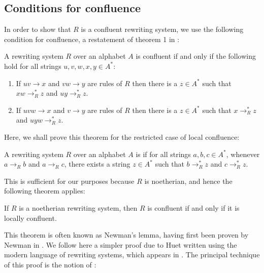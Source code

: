 \documentclass[nosubthm]{lmaths}
\begin{document}
\subsection{Conditions for confluence}

In order to show that $R$ is a confluent rewriting system, we use the following condition for confluence, a restatement of theorem 1 in \cite{McNaughton1987}:
\begin{theorem}
	A rewriting system $R$ over an alphabet $A$ is confluent if and only if the following hold for all strings $u, v, w, x, y \in A^*$:
	\begin{enumerate}[(1)]
		\item \label{it:conf-overlap} If $uv \to x$ and $vw \to y$ are rules of $R$ then there is a $z \in A^*$ such that $xw \to^*_R z$ and $uy \to^*_R z$.
		\item \label{it:conf-middle} If $uvw \to x$ and $v \to y$ are rules of $R$ then there is a $z \in A^*$ such that $x \to^*_R z$ and $uyw \to^*_R z$.
	\end{enumerate}
\end{theorem}

Here, we shall prove this theorem for the restricted case of local confluence:

\begin{defn}
	A rewriting system $R$ over an alphabet $A$ is  if for all strings $a, b, c \in A^*$, whenever $a \to_R b$ and $a \to_R c$, there exists a string $z \in A^*$ such that $b \to^*_R z$ and $c \to^*_R z$.
\end{defn}

This is sufficient for our purposes because $R$ is noetherian, and hence the following theorem applies:

\begin{theorem}[Newman] \label{thm:newman}
	If $R$ is a noetherian rewriting system, then $R$ is confluent if and only if it is locally confluent.
\end{theorem}

This theorem is often known as Newman's lemma, having first been proven by Newman in \cite{Newman1942}. We follow here a simpler proof due to Huet written using the modern language of rewriting systems, which appears in \cite{Huet1980}. The principal technique of this proof is the notion of :
\end{document}

